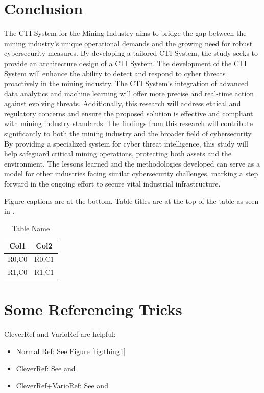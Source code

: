 \documentclass[a4paper,twoside,12pt]{report}
\begin{document}
\chapter{Conclusion}
The CTI System for the Mining Industry aims to bridge the gap between the mining industry's unique operational demands and the growing need for robust cybersecurity measures. By developing a tailored CTI System, the study seeks to provide an architecture design of a CTI System. The development of the CTI System will enhance the ability to detect and respond to cyber threats proactively in the mining industry. The CTI System's integration of advanced data analytics and machine learning will offer more precise and real-time action against evolving threats. Additionally, this research will address ethical and regulatory concerns and ensure the proposed solution is effective and compliant with mining industry standards.
The findings from this research will contribute significantly to both the mining industry and the broader field of cybersecurity. By providing a specialized system for cyber threat intelligence, this study will help safeguard critical mining operations, protecting both assets and the environment. The lessons learned and the methodologies developed can serve as a model for other industries facing similar cybersecurity challenges, marking a step forward in the ongoing effort to secure vital industrial infrastructure.






Figure captions are at the bottom. Table titles are at the top of the table as seen in . 

\begin{table}[p]
  \centering
  \caption{Table Name}
  \label{tab:tab1}
  \begin{tabular}{cc}
      \hline
      Col1 & Col2\\
      \hline\hline 
      R0,C0 & R0,C1 \\ 
      R1,C0 & R1,C1 \\ 
      \hline
  \end{tabular} 
\end{table}

\chapter{Some Referencing Tricks}
CleverRef and VarioRef are helpful:
\begin{itemize}
  \item Normal Ref: See Figure \ref{fig:thing1}
  \item CleverRef: See  and 
  \item CleverRef+VarioRef: See  and 
\end{itemize}
\end{document}
